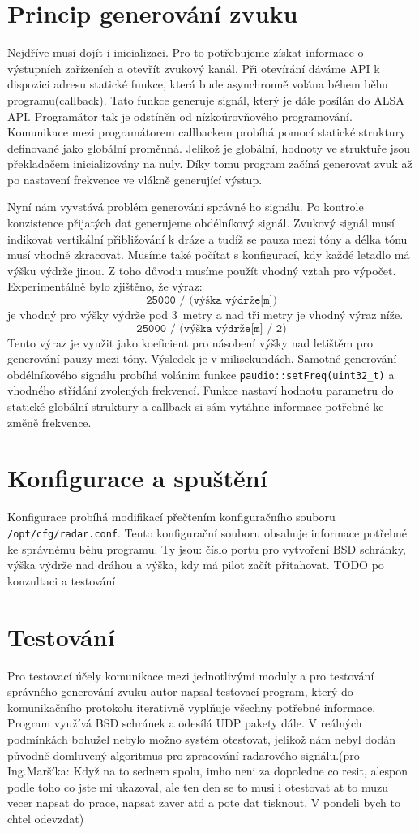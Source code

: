 	\section{Princip generování zvuku}
	Nejdříve musí dojít i inicializaci. Pro to potřebujeme získat informace o výstupních zařízeních a otevřít zvukový kanál. Při otevírání dáváme API k dispozici adresu statické funkce, která bude asynchronně volána během běhu programu(callback). Tato funkce generuje signál, který je dále posílán do ALSA API. Programátor tak je odstíněn od nízkoúrovňového programování. Komunikace mezi programátorem callbackem probíhá pomocí statické struktury definované jako globální proměnná. Jelikož je globální, hodnoty ve struktuře jsou překladačem inicializovány na nuly. Díky tomu program začíná generovat zvuk až po nastavení frekvence ve vlákně generující výstup.\par
	Nyní nám vyvstává problém generování správné ho signálu. Po kontrole konzistence přijatých dat generujeme obdélníkový signál. Zvukový signál musí indikovat vertikální přibližování k dráze a tudíž se pauza mezi tóny a délka tónu musí vhodně zkracovat. Musíme také počítat s konfigurací, kdy každé letadlo má výšku výdrže jinou. Z toho důvodu musíme použít vhodný vztah pro výpočet. Experimentálně bylo zjištěno, že výraz: \[\texttt{25000~/~(výška~výdrže[m])}\] je vhodný pro výšky výdrže pod 3~metry a nad tři metry je vhodný výraz níže. \[\texttt{25000~/~(výška~výdrže[m]~/~2)}\]
	Tento výraz je využit jako koeficient pro násobení výšky nad letištěm pro generování pauzy mezi tóny. Výsledek je v milisekundách. Samotné generování obdélníkového signálu probíhá voláním funkce \texttt{paudio::setFreq(uint32\_t)} a vhodného střídání zvolených frekvencí. Funkce nastaví hodnotu parametru do statické globální struktury a callback si sám vytáhne informace potřebné ke změně frekvence. 
	
	\section{Konfigurace a spuštění}
	Konfigurace probíhá modifikací přečtením konfiguračního souboru \texttt{/opt/cfg/radar.conf}. Tento konfigurační souboru obsahuje informace potřebné ke správnému běhu programu. Ty jsou: číslo portu pro vytvoření BSD schránky, výška výdrže nad dráhou a výška, kdy má pilot začít přitahovat. 
	TODO po konzultaci a testování
	
	\section{Testování}
	Pro testovací účely komunikace mezi jednotlivými moduly a pro testování správného generování zvuku autor napsal testovací program, který do komunikačního protokolu iterativně vyplňuje všechny potřebné informace. Program využívá BSD schránek a odesílá UDP pakety dále.
	V reálných podmínkách bohužel nebylo možno systém otestovat, jelikož nám nebyl dodán původně domluvený algoritmus pro zpracování radarového signálu.(pro Ing.Maršíka: Když na to sednem spolu, imho neni za dopoledne co resit, alespon podle toho co jste mi ukazoval, ale ten den se to musi i otestovat at to muzu vecer napsat do prace, napsat zaver atd a pote dat tisknout. V pondeli bych to chtel odevzdat) 
	

